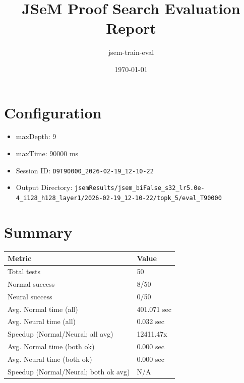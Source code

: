 \documentclass[a4paper,10pt]{article}
\title{JSeM Proof Search Evaluation Report}
\author{jsem-train-eval}
\date{\today}
\begin{document}
\maketitle

\section{Configuration}
\begin{itemize}
\item maxDepth: 9
\item maxTime: 90000 ms
\item Session ID: \texttt{D9T90000\_2026-02-19\_12-10-22}
\item Output Directory: \texttt{jsemResults/jsem\_biFalse\_s32\_lr5.0e-4\_i128\_h128\_layer1/2026-02-19\_12-10-22/topk\_5/eval\_T90000}
\end{itemize}

\section{Summary}
\begin{tabular}{ll}
\toprule
\textbf{Metric} & \textbf{Value} \\
\midrule
Total tests & 50 \\
Normal success & 8/50 \\
Neural success & 0/50 \\
\midrule
Avg. Normal time (all) & 401.071 sec \\
Avg. Neural time (all) & 0.032 sec \\
Speedup (Normal/Neural; all avg) & 12411.47x \\
Avg. Normal time (both ok) & 0.000 sec \\
Avg. Neural time (both ok) & 0.000 sec \\
Speedup (Normal/Neural; both ok avg) & N/A \\
\bottomrule
\end{tabular}
\end{document}
